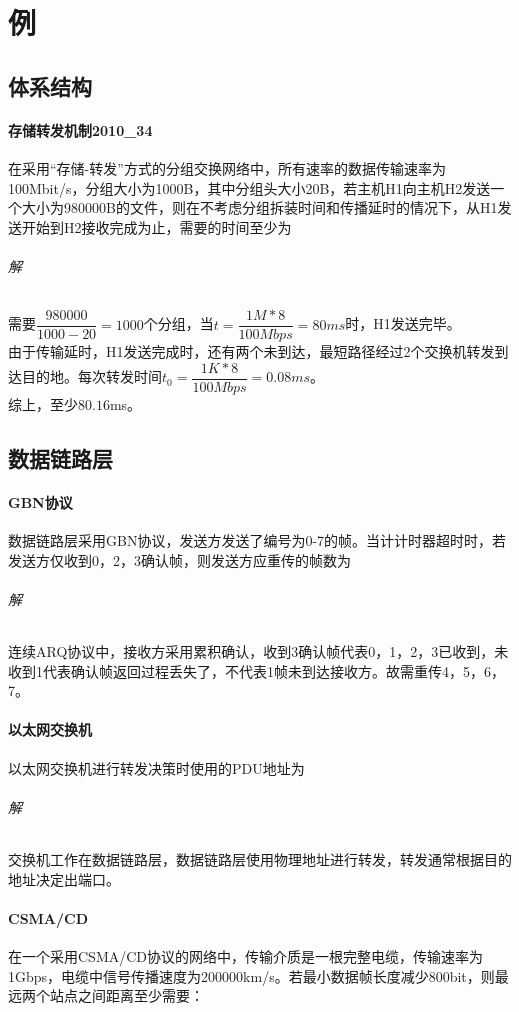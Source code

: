 
\chapter{例}

\section{体系结构}

\subsubsection{存储转发机制2010\_34}
在采用“存储-转发”方式的分组交换网络中，所有速率的数据传输速率为100Mbit/s，分组大小为1000B，其中分组头大小20B，若主机H1向主机H2发送一个大小为980000B的文件，则在不考虑分组拆装时间和传播延时的情况下，从H1发送开始到H2接收完成为止，需要的时间至少为

\subparagraph{解}
需要\(\dfrac{980000}{1000 - 20} = 1000\)个分组，当\(t = \dfrac{1M * 8}{100Mbps} = 80ms\)时，H1发送完毕。 \\
由于传输延时，H1发送完成时，还有两个未到达，最短路径经过2个交换机转发到达目的地。每次转发时间\(t_0 = \dfrac{1K * 8}{100Mbps} = 0.08ms\)。 \\
综上，至少\(80.16\)ms。


\section{数据链路层}

\subsubsection{GBN协议}
数据链路层采用GBN协议，发送方发送了编号为0-7的帧。当计计时器超时时，若发送方仅收到0，2，3确认帧，则发送方应重传的帧数为

\subparagraph{解}
连续ARQ协议中，接收方采用累积确认，收到3确认帧代表0，1，2，3已收到，未收到1代表确认帧返回过程丢失了，不代表1帧未到达接收方。故需重传4，5，6，7。


\subsubsection{以太网交换机}
以太网交换机进行转发决策时使用的PDU地址为

\subparagraph{解}
交换机工作在数据链路层，数据链路层使用物理地址进行转发，转发通常根据目的地址决定出端口。



\subsubsection{CSMA/CD}
在一个采用CSMA/CD协议的网络中，传输介质是一根完整电缆，传输速率为1Gbps，电缆中信号传播速度为200000km/s。若最小数据帧长度减少800bit，则最远两个站点之间距离至少需要：


